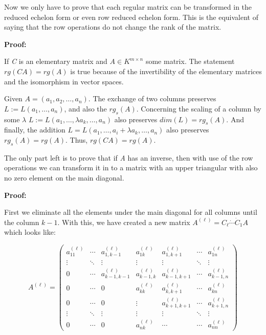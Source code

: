 \QED
\vspace{\baselineskip}

Now we only have to prove that each regular matrix can be transformed in the reduced echelon form or 
even row reduced echelon form. This is the equivalent of saying that the row operations do not change
the rank of the matrix.
\vspace{\baselineskip}

\textbf{Proof:}

If \emph{C} is an elementary matrix and \(A \in K^{m \times n}\) some matrix. The statement \(rg(CA) = rg(A)\) 
is true because of the invertibility of the elementary matrices and the isomorphism in vector spaces.
\vspace{\baselineskip}

Given \(A = (a_1, a_2, \dots, a_n)\). The exchange of two columns preserves \(L := L(a_1, \dots, a_n)\), 
and also the \(rg_s (A)\). Concerning the scaling of a column by some \(\lambda \) \(L := L(a_1, \dots, \lambda a_k, \dots, a_n)\) 
also preserves \(dim(L) = rg_s(A)\). And finally, the addition \(L = L(a_1, \dots, a_i + \lambda a_k, \dots, a_n)\) also preserves 
\(rg_s (A) = rg(A)\). Thus, \(rg(CA) = rg(A)\).

\QED
\vspace{\baselineskip}

The only part left is to prove that if \emph{A} has an inverse, then with use of the row operations we can 
transform it in to a matrix with an upper triangular with also no zero element on the main diagonal.
\vspace{\baselineskip}

\textbf{Proof:}

First we eliminate all the elements under the main diagonal for all columns until the column \(k - 1\).
With this, we have created a new matrix \(A^(\ell) = C_{\ell} \dot \cdots \dot C_1 A \) which looks 
like: 

\[
	A^{(\ell)} =
	\begin{pmatrix}
	a^{(\ell)}_{11} & \cdots & a^{(\ell)}_{1,k-1} & a^{(\ell)}_{1k} & a^{(\ell)}_{1,k+1} & \cdots & a^{(\ell)}_{1n} \\
	\vdots & \ddots & \vdots & \vdots & \vdots & \ddots & \vdots \\
	0 & \cdots & a^{(\ell)}_{k-1,k-1} & a^{(\ell)}_{k-1,k} & a^{(\ell)}_{k-1,k+1} & \cdots & a^{(\ell)}_{k-1,n} \\
	0 & \cdots & 0 & a^{(\ell)}_{kk} & a^{(\ell)}_{k,k+1} & \cdots & a^{(\ell)}_{kn} \\
	0 & \cdots & 0 & \vdots & a^{(\ell)}_{k+1,k+1} & \cdots & a^{(\ell)}_{k+1,n} \\
	\vdots & \ddots & \vdots & \vdots & \vdots & \ddots & \vdots \\
	0 & \cdots & 0 & a^{(\ell)}_{nk} & \cdots & \cdots & a^{(\ell)}_{nn}
	\end{pmatrix}
\]

